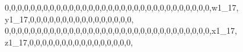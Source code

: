 \documentclass[]{article}
\newenvironment{Shaded}{\begin{snugshade}}{\end{snugshade}}
\newcommand{\DecValTok}[1]{\textcolor[rgb]{0.00,0.00,0.81}{#1}}
\newcommand{\NormalTok}[1]{#1}
\begin{document}
\begin{Shaded}
\begin{Highlighting}[]
\DecValTok{0}\NormalTok{,}\DecValTok{0}\NormalTok{,}\DecValTok{0}\NormalTok{,}\DecValTok{0}\NormalTok{,}\DecValTok{0}\NormalTok{,}\DecValTok{0}\NormalTok{,}\DecValTok{0}\NormalTok{,}\DecValTok{0}\NormalTok{,}\DecValTok{0}\NormalTok{,}\DecValTok{0}\NormalTok{,}\DecValTok{0}\NormalTok{,}\DecValTok{0}\NormalTok{,}\DecValTok{0}\NormalTok{,}\DecValTok{0}\NormalTok{,}\DecValTok{0}\NormalTok{,}\DecValTok{0}\NormalTok{,}\DecValTok{0}\NormalTok{,}\DecValTok{0}\NormalTok{,}\DecValTok{0}\NormalTok{,}\DecValTok{0}\NormalTok{,}\DecValTok{0}\NormalTok{,}\DecValTok{0}\NormalTok{,}\DecValTok{0}\NormalTok{,}\DecValTok{0}\NormalTok{,}\DecValTok{0}\NormalTok{,}\DecValTok{0}\NormalTok{,}\DecValTok{0}\NormalTok{,}\DecValTok{0}\NormalTok{,}\DecValTok{0}\NormalTok{,}\DecValTok{0}\NormalTok{,}\DecValTok{0}\NormalTok{,}\DecValTok{0}\NormalTok{,w1_}\DecValTok{17}\NormalTok{, y1_}\DecValTok{17}\NormalTok{,}\DecValTok{0}\NormalTok{,}\DecValTok{0}\NormalTok{,}\DecValTok{0}\NormalTok{,}\DecValTok{0}\NormalTok{,}\DecValTok{0}\NormalTok{,}\DecValTok{0}\NormalTok{,}\DecValTok{0}\NormalTok{,}\DecValTok{0}\NormalTok{,}\DecValTok{0}\NormalTok{,}\DecValTok{0}\NormalTok{,}\DecValTok{0}\NormalTok{,}\DecValTok{0}\NormalTok{,}\DecValTok{0}\NormalTok{,}\DecValTok{0}\NormalTok{,}\DecValTok{0}\NormalTok{,}\DecValTok{0}\NormalTok{,}
\DecValTok{0}\NormalTok{,}\DecValTok{0}\NormalTok{,}\DecValTok{0}\NormalTok{,}\DecValTok{0}\NormalTok{,}\DecValTok{0}\NormalTok{,}\DecValTok{0}\NormalTok{,}\DecValTok{0}\NormalTok{,}\DecValTok{0}\NormalTok{,}\DecValTok{0}\NormalTok{,}\DecValTok{0}\NormalTok{,}\DecValTok{0}\NormalTok{,}\DecValTok{0}\NormalTok{,}\DecValTok{0}\NormalTok{,}\DecValTok{0}\NormalTok{,}\DecValTok{0}\NormalTok{,}\DecValTok{0}\NormalTok{,}\DecValTok{0}\NormalTok{,}\DecValTok{0}\NormalTok{,}\DecValTok{0}\NormalTok{,}\DecValTok{0}\NormalTok{,}\DecValTok{0}\NormalTok{,}\DecValTok{0}\NormalTok{,}\DecValTok{0}\NormalTok{,}\DecValTok{0}\NormalTok{,}\DecValTok{0}\NormalTok{,}\DecValTok{0}\NormalTok{,}\DecValTok{0}\NormalTok{,}\DecValTok{0}\NormalTok{,}\DecValTok{0}\NormalTok{,}\DecValTok{0}\NormalTok{,}\DecValTok{0}\NormalTok{,}\DecValTok{0}\NormalTok{,x1_}\DecValTok{17}\NormalTok{, z1_}\DecValTok{17}\NormalTok{,}\DecValTok{0}\NormalTok{,}\DecValTok{0}\NormalTok{,}\DecValTok{0}\NormalTok{,}\DecValTok{0}\NormalTok{,}\DecValTok{0}\NormalTok{,}\DecValTok{0}\NormalTok{,}\DecValTok{0}\NormalTok{,}\DecValTok{0}\NormalTok{,}\DecValTok{0}\NormalTok{,}\DecValTok{0}\NormalTok{,}\DecValTok{0}\NormalTok{,}\DecValTok{0}\NormalTok{,}\DecValTok{0}\NormalTok{,}\DecValTok{0}\NormalTok{,}\DecValTok{0}\NormalTok{,}\DecValTok{0}\NormalTok{,}

\end{Highlighting}
\end{Shaded}
\end{document}
